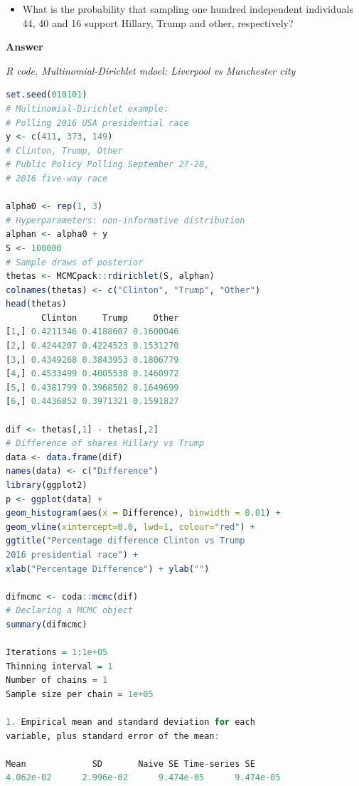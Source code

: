 \begin{enumerate}[leftmargin=*]
\begin{itemize}
	\item What is the probability that sampling one hundred independent individuals 44, 40 and 16 support Hillary, Trump and other, respectively?  
\end{itemize}

\textbf{Answer}

\begin{tcolorbox}[enhanced,width=4.67in,center upper,
	fontupper=\large\bfseries,drop shadow southwest,sharp corners]
	\textit{R code. Multinomial-Dirichlet mdoel: Liverpool vs Manchester city}
\begin{VF}
\begin{lstlisting}[basicstyle=\footnotesize, language=R]
set.seed(010101)
# Multinomial-Dirichlet example: 
# Polling 2016 USA presidential race
y <- c(411, 373, 149) 
# Clinton, Trump, Other
# Public Policy Polling September 27-28, 
# 2016 five-way race

alpha0 <- rep(1, 3)
# Hyperparameters: non-informative distribution
alphan <- alpha0 + y 
S <- 100000 
# Sample draws of posterior
thetas <- MCMCpack::rdirichlet(S, alphan)
colnames(thetas) <- c("Clinton", "Trump", "Other")
head(thetas)
       Clinton     Trump     Other
[1,] 0.4211346 0.4188607 0.1600046
[2,] 0.4244207 0.4224523 0.1531270
[3,] 0.4349268 0.3843953 0.1806779
[4,] 0.4533499 0.4005530 0.1460972
[5,] 0.4381799 0.3968502 0.1649699
[6,] 0.4436852 0.3971321 0.1591827

dif <- thetas[,1] - thetas[,2]
# Difference of shares Hillary vs Trump
data <- data.frame(dif)
names(data) <- c("Difference")
library(ggplot2)
p <- ggplot(data) +  
geom_histogram(aes(x = Difference), binwidth = 0.01) +
geom_vline(xintercept=0.0, lwd=1, colour="red") + 
ggtitle("Percentage difference Clinton vs Trump 
2016 presidential race") +
xlab("Percentage Difference") + ylab("")

difmcmc <- coda::mcmc(dif)
# Declaring a MCMC object
summary(difmcmc)

Iterations = 1:1e+05
Thinning interval = 1 
Number of chains = 1 
Sample size per chain = 1e+05 

1. Empirical mean and standard deviation for each 
variable, plus standard error of the mean:

Mean             SD       Naive SE Time-series SE 
4.062e-02      2.996e-02      9.474e-05      9.474e-05 
\end{lstlisting}
\end{VF}
\end{tcolorbox} 


\end{enumerate}

